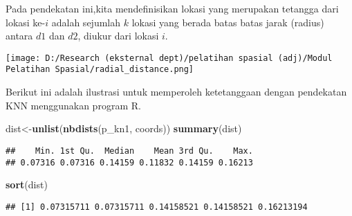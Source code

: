 \documentclass[
]{book}
\newenvironment{Shaded}{\begin{snugshade}}{\end{snugshade}}
\newcommand{\KeywordTok}[1]{\textcolor[rgb]{0.13,0.29,0.53}{\textbf{#1}}}
\newcommand{\NormalTok}[1]{#1}
\begin{document}
Pada pendekatan ini,kita mendefinisikan lokasi yang merupakan tetangga dari lokasi ke-\(i\) adalah sejumlah \(k\) lokasi yang berada batas batas jarak (radius) antara \(d1\) dan \(d2\), diukur dari lokasi \(i\).

\texttt{[image: D:/Research (eksternal dept)/pelatihan spasial (adj)/Modul Pelatihan Spasial/radial\_distance.png]}

Berikut ini adalah ilustrasi untuk memperoleh ketetanggaan dengan pendekatan KNN menggunakan program R.

\begin{Shaded}
\begin{Highlighting}[]
\NormalTok{dist\textless{}{-}}\KeywordTok{unlist}\NormalTok{(}\KeywordTok{nbdists}\NormalTok{(p\_kn1, coords))}
\KeywordTok{summary}\NormalTok{(dist)}
\end{Highlighting}
\end{Shaded}

\begin{verbatim}
##    Min. 1st Qu.  Median    Mean 3rd Qu.    Max. 
## 0.07316 0.07316 0.14159 0.11832 0.14159 0.16213
\end{verbatim}

\begin{Shaded}
\begin{Highlighting}[]
\KeywordTok{sort}\NormalTok{(dist)}
\end{Highlighting}
\end{Shaded}

\begin{verbatim}
## [1] 0.07315711 0.07315711 0.14158521 0.14158521 0.16213194
\end{verbatim}
\end{document}

